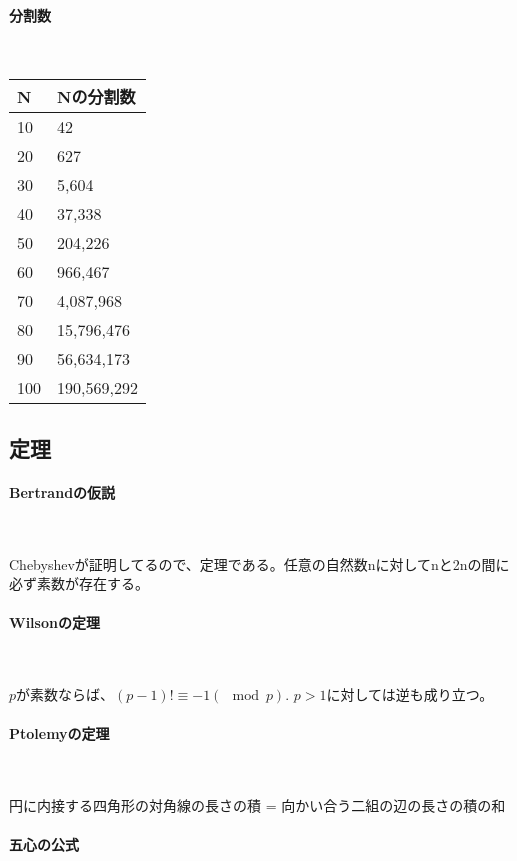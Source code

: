 \paragraph{分割数}　

\begin{tabular}{|l|l|}
\hline
N & Nの分割数 \\ \hline
10 & 42 \\ \hline
20 & 627 \\ \hline
30 & 5,604 \\ \hline
40 & 37,338 \\ \hline
50 & 204,226 \\ \hline
60 & 966,467 \\ \hline
70 & 4,087,968 \\ \hline
80 & 15,796,476 \\ \hline
90 & 56,634,173 \\ \hline
100 & 190,569,292 \\ \hline

\end{tabular}


\subsection{定理}

\paragraph{Bertrandの仮説}　

Chebyshevが証明してるので、定理である。任意の自然数nに対してnと2nの間に
必ず素数が存在する。


\paragraph{Wilsonの定理}　

$p$が素数ならば、$(p-1)! \equiv -1 (\mod p)$. 
$p>1$に対しては逆も成り立つ。


\paragraph{Ptolemyの定理}　

円に内接する四角形の対角線の長さの積 = 向かい合う二組の辺の長さの積の和


\paragraph{五心の公式}　


